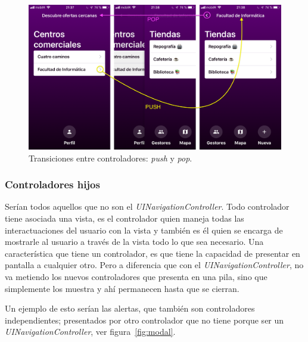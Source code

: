 \begin{figure}[tbp]
\centering
\includegraphics[scale=0.15]{figures/pop-push.png}
\caption{Transiciones entre controladores: \textit{push} y \textit{pop}.\label{ref:pop-push}}
\end{figure}

\subsubsection*{Controladores hijos}\label{contr-hijos}
Serían todos aquellos que no son el \textit{UINavigationController}. Todo controlador tiene asociada una vista, es el controlador quien maneja todas las interactuaciones del usuario con la vista y también es él quien se encarga de mostrarle al usuario a través de la vista todo lo que sea necesario. Una característica que tiene un controlador, es que tiene la capacidad de presentar en pantalla a cualquier otro. Pero a diferencia que con el \textit{UINavigationController}, no va metiendo los nuevos controladores que presenta en una pila, sino que simplemente los muestra y ahí permanecen hasta que se cierran.

Un ejemplo de esto serían las alertas, que también son controladores independientes; presentados por otro controlador que no tiene porque ser un \textit{UINavigationController}, ver figura~\ref{fig:modal}.

